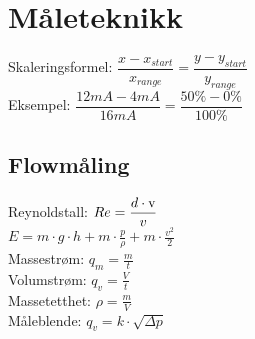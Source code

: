 \section{Måleteknikk}
\vskip 2.5pt 
Skaleringsformel:
\vskip 2.5pt 
$\dfrac{x-x_{start}}{x_{range}}=\dfrac{y-y_{start}}{y_{range}}$\\
Eksempel: $\dfrac{12mA-4mA}{16mA}=\dfrac{50\%-0\%}{100\%}$
\vskip 2.5pt 
\subsection*{Flowmåling}
\vskip 2.5pt 
Reynoldstall: $Re=\dfrac {d \cdot \text v}{v}$\\
\vskip 2.5pt 
$E=m\cdot g\cdot h+m\cdot \frac{p}{\rho}+m\cdot \frac {v^2}{2} $\\
\vskip 2.5pt 
Massestrøm: $q_m=\frac{m}{t}$\\
\vskip 2.5pt 
Volumstrøm: $q_v=\frac{V}{t}$\\
\vskip 2.5pt 
Massetetthet: $\rho=\frac{m}{V}$\\
\vskip 2.5pt 
Måleblende: $q_v=k\cdot \sqrt{\Delta p}$\\
\vskip 2.5pt 
